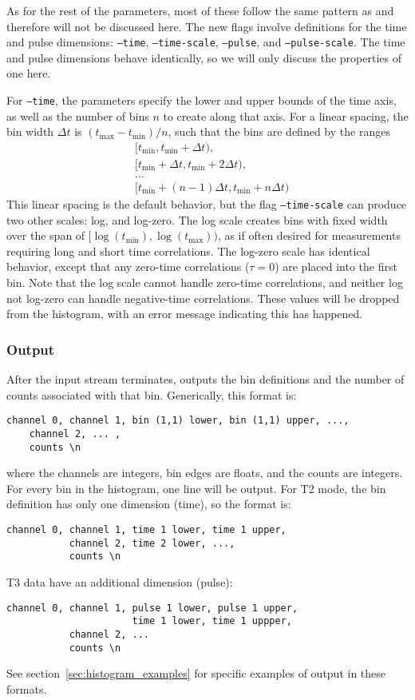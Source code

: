As for the rest of the parameters, most of these follow the same pattern as  and therefore will not be discussed here. The new flags involve definitions for the time and pulse dimensions: \texttt{--time}, \texttt{--time-scale}, \texttt{--pulse},  and \texttt{--pulse-scale}. The time and pulse dimensions behave identically, so we will only discuss the properties of one here.

For \texttt{--time}, the parameters specify the lower and upper bounds of the time axis, as well as the number of bins $n$ to create along that axis. For a linear spacing, the bin width $\Delta t$ is $(t_{\max}-t_{\min})/n$, such that the bins are defined by the ranges
\begin{equation}
\begin{aligned}
&[t_{\min},t_{\min}+\Delta t),\\
&[t_{\min}+\Delta t,t_{\min}+2\Delta t),\\
&\ldots\\
&[t_{\min}+(n-1)\Delta t,t_{\min}+n\Delta t)
\end{aligned}
\end{equation}
This linear spacing is the default behavior, but the flag \texttt{--time-scale} can produce two other scales: log, and log-zero. The log scale creates bins with fixed width over the span of $[\log(t_{\min}),\log(t_{\max}))$, as if often desired for measurements requiring long and short time correlations. The log-zero scale has identical behavior, except that any zero-time correlations ($\tau=0$) are placed into the first bin. Note that the log scale cannot handle zero-time correlations, and neither log not log-zero can handle negative-time correlations. These values will be dropped from the histogram, with an error message indicating this has happened.

\subsubsection{Output}
After the input stream terminates,  outputs the bin definitions and the number of counts associated with that bin. Generically, this format is:
\begin{verbatim}
channel 0, channel 1, bin (1,1) lower, bin (1,1) upper, ...,
    channel 2, ... , 
    counts \n
\end{verbatim}
where the channels are integers, bin edges are floats, and the counts are integers. For every bin in the histogram, one line will be output. For T2 mode, the bin definition has only one dimension (time), so the format is:
\begin{verbatim}
channel 0, channel 1, time 1 lower, time 1 upper, 
           channel 2, time 2 lower, ...,
           counts \n
\end{verbatim}
T3 data have an additional dimension (pulse):
\begin{verbatim}
channel 0, channel 1, pulse 1 lower, pulse 1 upper,
                      time 1 lower, time 1 uppper,
           channel 2, ...
           counts \n
\end{verbatim}
See section~\ref{sec:histogram_examples} for specific examples of output in these formats.


